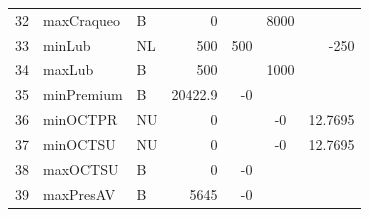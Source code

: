 \documentclass[a4paper,10pt]{article}
\begin{document}
\begin{flushleft}
\begin{tabular}{| l  l  l  r  r  c  r |}
     32 &   maxCraqueo &     B &                0 &                   &       8000   &  			\\ 
     33 &   minLub &         NL &             500 &             500 &                &           -250 \\ 
     34 &   maxLub &         B &              500 &                 &         1000    &  		\\ 
     35 &   minPremium &     B &          20422.9 &              -0 &                & 		\\ 
     36 &   minOCTPR &       NU &               0 &                  &             -0 &         12.7695 \\ 
     37 &   minOCTSU &       NU &               0 &                  &             -0 &         12.7695 \\ 
     38 &   maxOCTSU &       B &                0 &              -0 &                &		\\ 
     39 &   maxPresAV &      B &             5645 &              -0 &                &		\\ 
     \hline
       \end{tabular}
\end{flushleft}%
\end{document}

